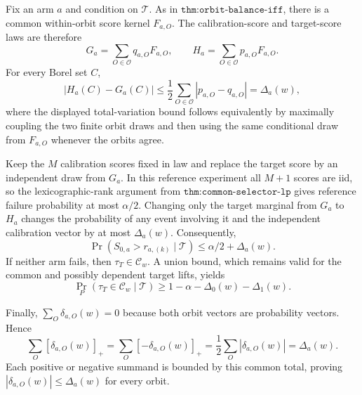 Fix an arm \(a\) and condition on \(\mathcal T\). As in \(\texttt{thm:orbit-balance-iff}\), there is a common within-orbit score kernel \(F_{a,O}\). The calibration-score and target-score laws are therefore \[G_a=\sum_{O\in\mathcal O}q_{a,O}F_{a,O},\qquad H_a=\sum_{O\in\mathcal O}p_{a,O}F_{a,O}.\] For every Borel set \(C\), \[|H_a(C)-G_a(C)|\le\frac12\sum_{O\in\mathcal O}|p_{a,O}-q_{a,O}|=\Delta_a(w),\] where the displayed total-variation bound follows equivalently by maximally coupling the two finite orbit draws and then using the same conditional draw from \(F_{a,O}\) whenever the orbits agree.

Keep the \(M\) calibration scores fixed in law and replace the target score by an independent draw from \(G_a\). In this reference experiment all \(M+1\) scores are iid, so the lexicographic-rank argument from \(\texttt{thm:common-selector-lp}\) gives reference failure probability at most \(\alpha/2\). Changing only the target marginal from \(G_a\) to \(H_a\) changes the probability of any event involving it and the independent calibration vector by at most \(\Delta_a(w)\). Consequently, \[\Pr(S_{0,a}>r_{a,(k)}\mid\mathcal T)\le\alpha/2+\Delta_a(w).\] If neither arm fails, then \(\tau_T\in\mathcal C_w\). A union bound, which remains valid for the common and possibly dependent target lifts, yields \[\Pr_P(\tau_T\in\mathcal C_w\mid\mathcal T)\ge1-\alpha-\Delta_0(w)-\Delta_1(w).\]

Finally, \(\sum_O\delta_{a,O}(w)=0\) because both orbit vectors are probability vectors. Hence \[\sum_O[\delta_{a,O}(w)]_+=\sum_O[-\delta_{a,O}(w)]_+=\frac12\sum_O|\delta_{a,O}(w)|=\Delta_a(w).\] Each positive or negative summand is bounded by this common total, proving \(|\delta_{a,O}(w)|\le\Delta_a(w)\) for every orbit.